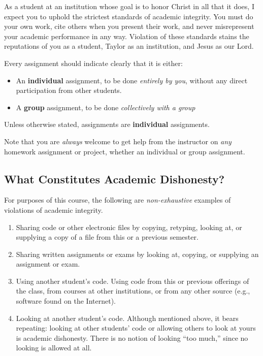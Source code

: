 As a student at an institution whose goal is to honor Christ in all that it does,
I expect you to uphold the strictest standards of academic integrity.
You must do your own work,
cite others when you present their work,
and never misrepresent your academic performance in any way.
Violation of these standards stains the reputations of you as a student,
Taylor as an institution,
and Jesus as our Lord.

Every assignment should indicate clearly
that it is either:
\begin{itemize}
\item An \textbf{individual} assignment,
  to be done \emph{entirely by you},
  without any direct participation from other students.
\item A \textbf{group} assignment, to be done \emph{collectively with a group}
\end{itemize}
Unless otherwise stated,
assignments are \textbf{individual} assignments.

\begin{flushleft}
  \begin{framed}
    Note that you are \emph{always} welcome
    to get help from the instructor on \emph{any}
    homework assignment or project,
    whether an individual or group assignment.
  \end{framed}
\end{flushleft}

\subsection{What Constitutes Academic Dishonesty?}

For purposes of this course, the following are \emph{non-exhaustive} examples
of violations of academic integrity.
\begin{enumerate}
\item
  Sharing code or other electronic files by copying, retyping, looking at,
  or supplying a copy of a file from this or a previous semester. 
\item
  Sharing written assignments or exams by looking at, copying, or supplying
  an assignment or exam.
\item
  Using another student's code. Using code from this or previous offerings of the
  class, from courses at other institutions, or from any other source (e.g.,
  software found on the Internet).
\item Looking at another student's code. Although mentioned above, it bears
  repeating: looking at other students' code or allowing others to look at yours
  is academic dishonesty. There is no notion of looking ``too much,'' since no looking is
  allowed at all.
\end{enumerate}

